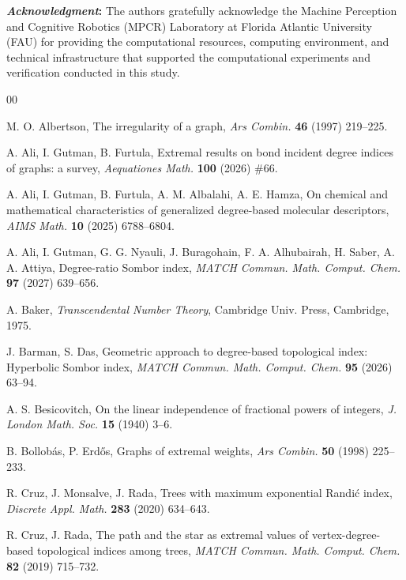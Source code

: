 \documentclass[a5paper, 10pt]{article}
\theoremstyle{plain}
\theoremstyle{remark}
\theoremstyle{definition}
\newcommand{\acknowledgment}[1]{\vspace{5mm}\singlespacing
	{\noindent\textbf{\textit{Acknowledgment\/}:} #1}
}
\begin{document}
\acknowledgment{The authors gratefully acknowledge the Machine Perception and Cognitive Robotics (MPCR) Laboratory at Florida Atlantic University (FAU) for providing the computational resources, computing environment, and technical infrastructure that supported the computational experiments and verification conducted in this study.}

\singlespacing

 \begin{thebibliography}{00}

   M. O. Albertson, The irregularity of a graph,
  \textit{Ars Combin.\/} \textbf{46} (1997) 219--225.

   A. Ali, I. Gutman, B. Furtula,
  Extremal results on bond incident degree indices of graphs: a survey,
  \textit{Aequationes Math.\/} \textbf{100} (2026) \#66.

   A. Ali, I. Gutman,
  B. Furtula, A. M. Albalahi, A. E. Hamza, On chemical and mathematical
  characteristics of generalized degree-based molecular descriptors,
  \textit{AIMS Math.\/} \textbf{10} (2025) 6788--6804.

   A. Ali, I. Gutman, G. G. Nyauli, J. Buragohain,
  F. A. Alhubairah, H. Saber, A. A. Attiya, Degree-ratio Sombor index,
  \textit{MATCH Commun. Math. Comput. Chem.\/} \textbf{97} (2027) 639--656.

   A. Baker, \textit{Transcendental Number Theory\/},
  Cambridge Univ. Press, Cambridge, 1975.

   J. Barman, S. Das, Geometric approach to
  degree-based topological index: Hyperbolic Sombor index, \textit{MATCH
  Commun. Math. Comput. Chem.\/} \textbf{95} (2026) 63--94.

   A. S. Besicovitch, On the linear independence
  of fractional powers of integers, \textit{J. London Math. Soc.\/}
  \textbf{15} (1940) 3--6.

  B. Bollob\'as, P. Erd\H{o}s, Graphs of extremal weights, \textit{Ars Combin.\/}
  \textbf{50} (1998) 225--233.

   R. Cruz, J. Monsalve, J. Rada, Trees with
  maximum exponential Randi\'c index, \textit{Discrete Appl. Math.\/}
  \textbf{283} (2020) 634--643.

   R. Cruz, J. Rada, The path and the star as
  extremal values of vertex-degree-based topological indices among trees,
  \textit{MATCH Commun. Math. Comput. Chem.\/} \textbf{82} (2019) 715--732.


\end{thebibliography}
\end{document}
